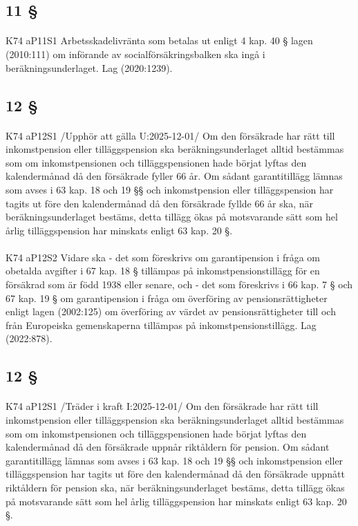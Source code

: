 \documentclass[a4paper,notitlepage,openany,10pt]{book}
\begin{document}
\subsection*{11 §}
\paragraph*{}
{\tiny K74 aP11S1}
Arbetsskadelivränta som betalas ut enligt 4 kap. 40 § lagen (2010:111) om införande av socialförsäkringsbalken ska ingå i beräkningsunderlaget.
Lag (2020:1239).
\subsection*{12 §}
\paragraph*{}
{\tiny K74 aP12S1}
/Upphör att gälla U:2025-12-01/
Om den försäkrade har rätt till inkomstpension eller tilläggspension ska beräkningsunderlaget alltid bestämmas som om inkomstpensionen och tilläggspensionen hade börjat lyftas den kalendermånad då den försäkrade fyller 66 år. Om sådant garantitillägg lämnas som avses i 63 kap. 18 och 19 §§ och inkomstpension eller tilläggspension har tagits ut före den kalendermånad då den försäkrade fyllde 66 år ska, när beräkningsunderlaget bestäms, detta tillägg ökas på motsvarande sätt som hel årlig tilläggspension har minskats enligt 63 kap. 20 §.
\paragraph*{}
{\tiny K74 aP12S2}
Vidare ska
\newline - det som föreskrivs om garantipension i fråga om obetalda avgifter i 67 kap. 18 § tillämpas på inkomstpensionstillägg för en försäkrad som är född 1938 eller senare, och
\newline - det som föreskrivs i 66 kap. 7 § och 67 kap. 19 § om garantipension i fråga om överföring av pensionsrättigheter enligt lagen (2002:125) om överföring av värdet av pensionsrättigheter till och från Europeiska gemenskaperna tillämpas på inkomstpensionstillägg.
Lag (2022:878).
\subsection*{12 §}
\paragraph*{}
{\tiny K74 aP12S1}
/Träder i kraft I:2025-12-01/
Om den försäkrade har rätt till inkomstpension eller tilläggspension ska beräkningsunderlaget alltid bestämmas som om inkomstpensionen och tilläggspensionen hade börjat lyftas den kalendermånad då den försäkrade uppnår riktåldern för pension. Om sådant garantitillägg lämnas som avses i 63 kap. 18 och 19 §§ och inkomstpension eller tilläggspension har tagits ut före den kalendermånad då den försäkrade uppnått riktåldern för pension ska, när beräkningsunderlaget bestäms, detta tillägg ökas på motsvarande sätt som hel årlig tilläggspension har minskats enligt 63 kap. 20 §.
\end{document}
